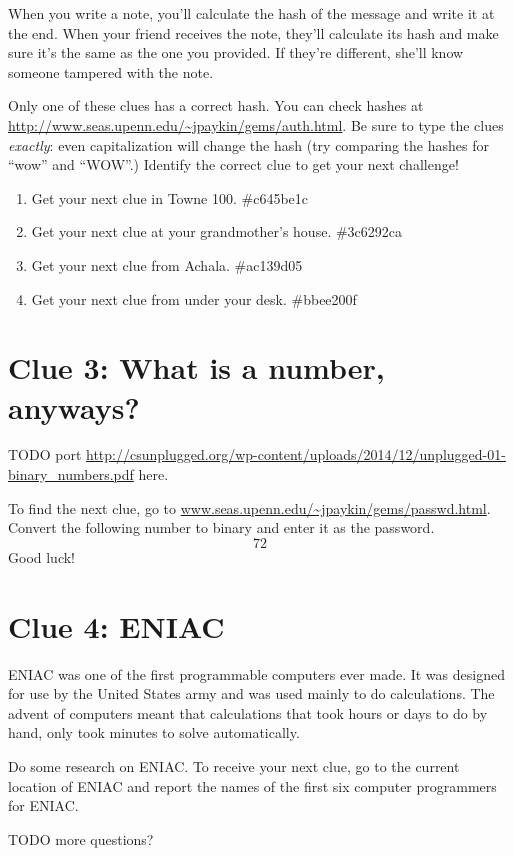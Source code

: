\documentclass{article}
\begin{document}
When you write a note, you'll calculate the hash of the message and write it at the end. When your friend receives the note, they'll calculate its hash and make sure it's the same as the one you provided. If they're different, she'll know someone tampered with the note.

Only one of these clues has a correct hash. You can check hashes at \url{http://www.seas.upenn.edu/~jpaykin/gems/auth.html}. Be sure to type the clues \textit{exactly}: even capitalization will change the hash (try comparing the hashes for ``wow'' and ``WOW''.) Identify the correct clue to get your next challenge!

\begin{enumerate}
  \item Get your next clue in Towne 100. \#c645be1c
  \item Get your next clue at your grandmother's house. \#3c6292ca
  \item Get your next clue from Achala. \#ac139d05
  \item Get your next clue from under your desk. \#bbee200f
\end{enumerate}

\newpage

\section*{Clue 3: What is a number, anyways?}
TODO port \url{http://csunplugged.org/wp-content/uploads/2014/12/unplugged-01-binary_numbers.pdf} here.

To find the next clue, go to \url{www.seas.upenn.edu/~jpaykin/gems/passwd.html}. Convert the following number to binary and enter it as the password.
$$72$$
Good luck!
  
\newpage


\section*{Clue 4: ENIAC}
ENIAC was one of the first programmable computers ever made. It was designed for use by the United States army and was used mainly to do calculations. The advent of computers meant that calculations that took hours or days to do by hand, only took minutes to solve automatically.

Do some research on ENIAC. To receive your next clue, go to the current location of ENIAC and report the names of the first six computer programmers for ENIAC.

TODO more questions?
\end{document}
